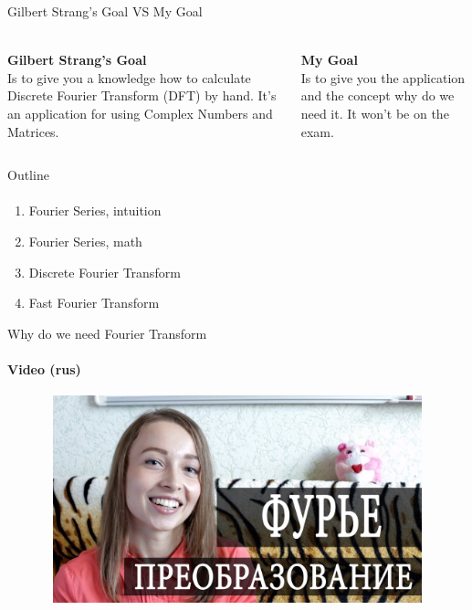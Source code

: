 \documentclass[aspectratio=169]{beamer}
\begin{document}
\begin{frame}[t]{Gilbert Strang's Goal VS My Goal}
\framesubtitle{}
\Large
    \begin{columns}[T,onlytextwidth]
        \begin{column}{0.49\textwidth}
            \textbf{Gilbert Strang's Goal} \\
            Is to give you a knowledge how to calculate Discrete Fourier Transform (DFT) by hand. It's an application for using Complex Numbers and Matrices.
        \end{column}
        \begin{column}{0.49\textwidth}
            \textbf{My Goal} \\ 
            Is to give you the application and the concept why do we need it. It won't be on the exam.
        \end{column}
    \end{columns}
\end{frame}

\begin{frame}[t]{Outline}
\framesubtitle{}
    \Large
    \begin{enumerate}
        \item Fourier Series, intuition
        \item Fourier Series, math
        \item Discrete Fourier Transform
        \item Fast Fourier Transform
    \end{enumerate}
\end{frame}

\begin{frame}[t]{Why do we need Fourier Transform}
    \framesubtitle{Video (rus)}
    \vspace{-0.6cm}
    \begin{figure}[H]
        \href{https://youtu.be/Vaa1BVGhpxI}{
            \centering\includegraphics[height=6cm,width=1\textwidth,keepaspectratio]{wdwnfourier_rus.jpg}}
        \label{fig:file_name}
    \end{figure}
\end{frame}
\end{document}

